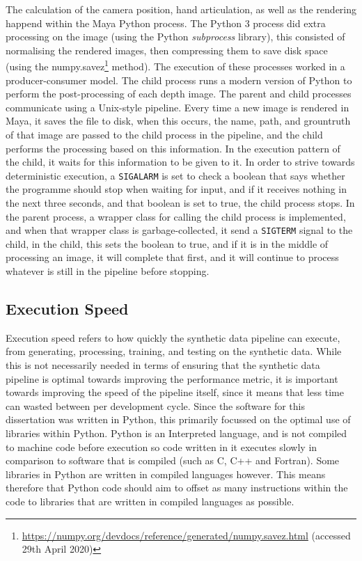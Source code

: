 The calculation of the camera position, hand articulation, as well as the rendering happend within the Maya Python process. The Python 3 process did extra processing on the image (using the Python {\slshape subprocess} library), this consisted of normalising the rendered images, then compressing them to save disk space (using the numpy.savez\footnote{\url{https://numpy.org/devdocs/reference/generated/numpy.savez.html} (accessed 29th April 2020)} method). The execution of these processes worked in a producer-consumer model. The child process runs a modern version of Python to perform the post-processing of each depth image. The parent and child processes communicate using a Unix-style pipeline. Every time a new image is rendered in Maya, it saves the file to disk, when this occurs, the name, path, and grountruth of that image are passed to the child process in the pipeline, and the child performs the processing based on this information. In the execution pattern of the child, it waits for this information to be given to it. In order to strive towards deterministic execution, a \verb|SIGALARM| is set to check a boolean that says whether the programme should stop when waiting for input, and if it receives nothing in the next three seconds, and that boolean is set to true, the child process stops. In the parent process, a wrapper class for calling the child process is implemented, and when that wrapper class is garbage-collected, it send a \verb|SIGTERM| signal to the child, in the child, this sets the boolean to true, and if it is in the middle of processing an image, it will complete that first, and it will continue to process whatever is still in the pipeline before stopping.

\subsection{Execution Speed}
Execution speed refers to how quickly the synthetic data pipeline can execute, from generating, processing, training, and testing on the synthetic data. While this is not necessarily needed in terms of ensuring that the synthetic data pipeline is optimal towards improving the performance metric, it is important towards improving the speed of the pipeline itself, since it means that less time can wasted between per development cycle. Since the software for this dissertation was written in Python, this primarily focussed on the optimal use of libraries within Python. Python is an Interpreted language, and is not compiled to machine code before execution so code written in it executes slowly in comparison to software that is compiled (such as C, C++ and Fortran). Some libraries in Python are written in compiled languages however. This means therefore that Python code should aim to offset as many instructions within the code to libraries that are written in compiled languages as possible.

